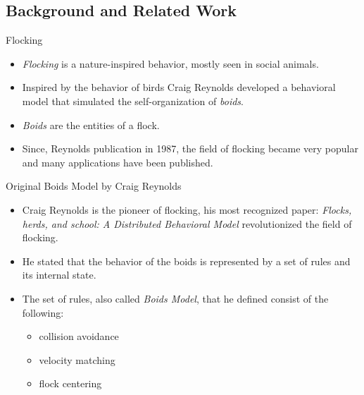 \documentclass[red]{beamer}
\begin{document}
\subsection{Background and Related Work}


\begin{frame}{Flocking}
	\begin{itemize}
		\pause \item \textit{Flocking} is a nature-inspired behavior, mostly seen in social animals.
		\pause \item Inspired by the behavior of birds Craig Reynolds developed a behavioral model that simulated the self-organization of \textit{boids}.
		\pause \item \textit{Boids} are the entities of a flock.
		\pause \item Since, Reynolds publication in 1987, the field of flocking became very popular and many applications have been published.
	\end{itemize}
\end{frame}

\begin{frame}{Original Boids Model by Craig Reynolds}
	\begin{itemize}
		\pause \item Craig Reynolds is the pioneer of flocking, his most recognized paper: \textit{Flocks, herds, and school: A Distributed Behavioral Model} revolutionized the field of flocking.
		\pause \item He stated that the behavior of the boids is represented by a set of rules and its internal state.
		\pause \item The set of rules, also called \textit{Boids Model}, that he defined consist of the following:
			\begin{itemize}
				\pause \item collision avoidance
				\pause \item velocity matching
				\pause \item flock centering
			\end{itemize}
	\end{itemize}
\end{frame}
\end{document}
